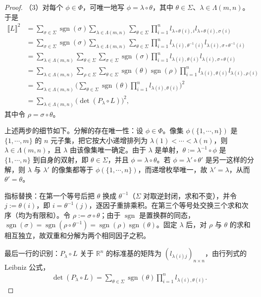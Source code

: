 \documentclass[../../main.tex]{subfiles}%
\begin{document}
\begin{proof}
（3）对每个 $\phi\in\Phi$，可唯一地写 $\phi=\lambda\circ\theta$，其中 $\theta\in\Sigma$、$\lambda\in\Lambda(m,n)$。于是
\begin{align*}
\llbracket L\rrbracket^2
&=\sum_{\sigma\in\Sigma}\operatorname{sgn}(\sigma)\sum_{\lambda\in\Lambda(m,n)}\sum_{\theta\in\Sigma}
\prod_{i=1}^nl_{\lambda\circ\theta(i),i}l_{\lambda\circ\theta(i),\sigma(i)}\\
&=\sum_{\sigma\in\Sigma}\operatorname{sgn}(\sigma)\sum_{\lambda\in\Lambda(m,n)}\sum_{\theta\in\Sigma}
\prod_{i=1}^nl_{\lambda(i),\theta^{-1}(i)}l_{\lambda(i),\sigma\circ\theta^{-1}(i)}\\
&=\sum_{\lambda\in\Lambda(m,n)}\sum_{\theta\in\Sigma}\sum_{\sigma\in\Sigma}
\operatorname{sgn}(\sigma)\prod_{i=1}^nl_{\lambda(i),\theta(i)}l_{\lambda(i),\sigma\circ\theta(i)}\\
&=\sum_{\lambda\in\Lambda(m,n)}\sum_{\rho\in\Sigma}\sum_{\theta\in\Sigma}
\operatorname{sgn}(\theta)\operatorname{sgn}(\rho)\prod_{i=1}^nl_{\lambda(i),\theta(i)}l_{\lambda(i),\rho(i)}\\
&=\sum_{\lambda\in\Lambda(m,n)}\Biggl(\sum_{\theta\in\Sigma}\operatorname{sgn}(\theta)\prod_{i=1}^nl_{\lambda(i),\theta(i)}\Biggr)^2\\
&=\sum_{\lambda\in\Lambda(m,n)}\bigl(\det(P_\lambda\circ L)\bigr)^2,
\end{align*}
其中令 $\rho=\sigma\circ\theta$。

上述两步的细节如下。分解的存在唯一性：设 $\phi\in\Phi$。像集 $\phi(\{1,\cdots,n\})$ 是 $\{1,\cdots,m\}$ 的 $n$ 元子集，把它按大小递增排列为 $\lambda(1)<\cdots<\lambda(n)$，则 $\lambda\in\Lambda(m,n)$，且 $\lambda$ 由该像集唯一确定。由于 $\lambda$ 是单射，$\theta:=\lambda^{-1}\circ\phi$ 是 $\{1,\cdots,n\}$ 到自身的双射，即 $\theta\in\Sigma$，并且 $\phi=\lambda\circ\theta$。若 $\phi=\lambda'\circ\theta'$ 是另一这样的分解，则 $\lambda$ 与 $\lambda'$ 的像集都等于 $\phi(\{1,\cdots,n\})$，而递增枚举唯一，故 $\lambda'=\lambda$，从而 $\theta'=\theta$。

指标替换：在第一个等号后把 $\theta$ 换成 $\theta^{-1}$（$\Sigma$ 对取逆封闭，求和不变），并令 $j:=\theta(i)$，即 $i=\theta^{-1}(j)$，逐因子重排乘积。在第三个等号处交换三个求和次序（均为有限和）。令 $\rho:=\sigma\circ\theta$；由于 $\operatorname{sgn}$ 是置换群的同态，$\operatorname{sgn}(\sigma)=\operatorname{sgn}(\rho\circ\theta^{-1})=\operatorname{sgn}(\rho)\operatorname{sgn}(\theta)$。固定 $\lambda$ 后，对 $\rho$ 与 $\theta$ 的求和相互独立，故双重和分解为两个相同因子之积。

最后一行的识别：$P_\lambda\circ L$ 关于 $\mathbb{R}^n$ 的标准基的矩阵为 $(l_{\lambda(i)j})_{n\times n}$，由行列式的 Leibniz 公式，
\begin{align*}
\det(P_\lambda\circ L)=\sum_{\theta\in\Sigma}\operatorname{sgn}(\theta)\prod_{i=1}^nl_{\lambda(i),\theta(i)}.
\end{align*}
\end{proof}
\end{document}
